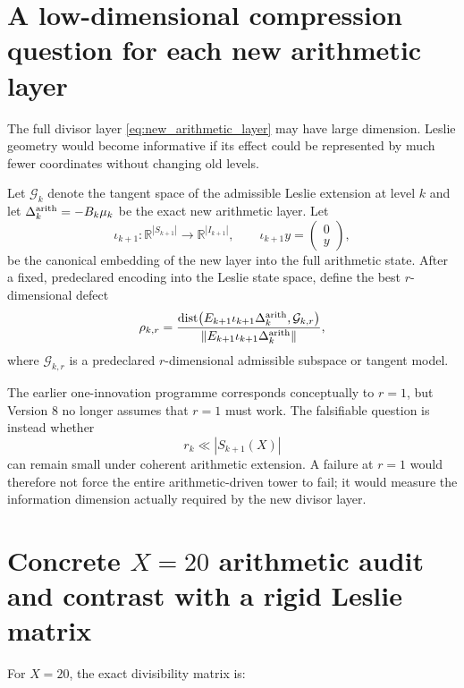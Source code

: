 \documentclass[11pt]{amsart}
\numberwithin{equation}{section}
\theoremstyle{plain}
\theoremstyle{definition}
\theoremstyle{remark}
\begin{document}
\section{A low-dimensional compression question for each new arithmetic layer}
\label{sec:layer_compression_question}

The full divisor layer \eqref{eq:new_arithmetic_layer} may have large dimension.  Leslie
geometry would become informative if its effect could be represented by much fewer coordinates
without changing old levels.

Let $\mathcal G_k$ denote the tangent space of the admissible Leslie extension at level $k$ and
let $\Delta_k^{\rm arith}=-B_k\mu_k$ be the exact new arithmetic layer.  Let
\[
\iota_{k+1}:\mathbb R^{|S_{k+1}|}\to\mathbb R^{|I_{k+1}|},
\qquad
\iota_{k+1}y=
\begin{pmatrix}0\\y\end{pmatrix},
\]
be the canonical embedding of the new layer into the full arithmetic state.  After a fixed,
predeclared encoding into the Leslie state space, define the best $r$-dimensional defect
\begin{equation}
\rho_{k,r}
=
\frac{
\operatorname{dist}\!\left(
E_{k+1}\iota_{k+1}\Delta_k^{\rm arith},
\mathcal G_{k,r}
\right)
}{
\|E_{k+1}\iota_{k+1}\Delta_k^{\rm arith}\|
},
\label{eq:layer_compression_defect}
\end{equation}
where $\mathcal G_{k,r}$ is a predeclared $r$-dimensional admissible subspace or tangent model.

The earlier one-innovation programme corresponds conceptually to $r=1$, but Version 8 no longer
assumes that $r=1$ must work.  The falsifiable question is instead whether
\[
r_k\ll |S_{k+1}(X)|
\]
can remain small under coherent arithmetic extension.  A failure at $r=1$ would therefore not
force the entire arithmetic-driven tower to fail; it would measure the information dimension
actually required by the new divisor layer.


\section{Concrete $X=20$ arithmetic audit and contrast with a rigid Leslie matrix}
\label{sec:X20_contrast}

For $X=20$, the exact divisibility matrix is:
\end{document}
